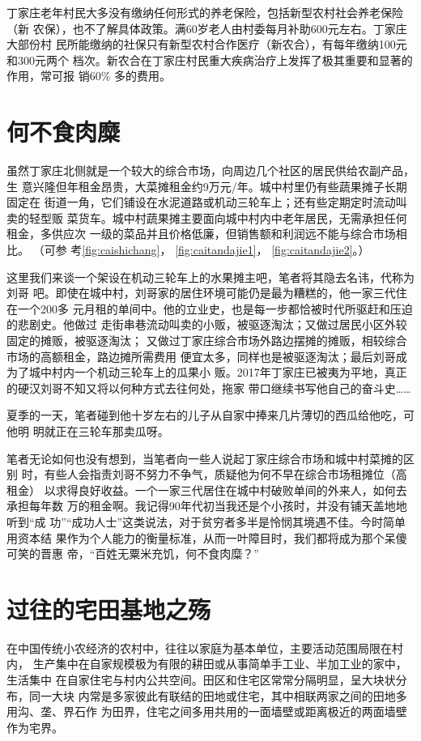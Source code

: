 丁家庄老年村民大多没有缴纳任何形式的养老保险，包括新型农村社会养老保险（新
农保），也不了解具体政策。满60岁老人由村委每月补助600元左右。丁家庄大部份村
民所能缴纳的社保只有新型农村合作医疗（新农合），有每年缴纳100元和300元两个
档次。新农合在丁家庄村民重大疾病治疗上发挥了极其重要和显著的作用，常可报
销60\% 多的费用。

\section{何不食肉糜}

虽然丁家庄北侧就是一个较大的综合市场，向周边几个社区的居民供给农副产品，生
意兴隆但年租金昂贵，大菜摊租金约9万元/年。城中村里仍有些蔬果摊子长期固定在
街道一角，它们铺设在水泥道路或机动三轮车上；还有些定期定时流动叫卖的轻型贩
菜货车。城中村蔬果摊主要面向城中村内中老年居民，无需承担任何租金，多供应次
一级的菜品并且价格低廉，但销售额和利润远不能与综合市场相比。 （可参
考\cref{fig:caishichang}， \cref{fig:caitandajie1}，
\cref{fig:caitandajie2}。）

这里我们来谈一个架设在机动三轮车上的水果摊主吧，笔者将其隐去名讳，代称为刘哥
吧。即使在城中村，刘哥家的居住环境可能仍是最为糟糕的，他一家三代住在一个200多
元月租的单间中。他的立业史，也是每一步都恰被时代所驱赶和压迫的悲剧史。他做过
走街串巷流动叫卖的小贩，被驱逐淘汰；又做过居民小区外较固定的摊贩，被驱逐淘汰；
又做过丁家庄综合市场外路边摆摊的摊贩，相较综合市场的高额租金，路边摊所需费用
便宜太多，同样也是被驱逐淘汰；最后刘哥成为了城中村内一个机动三轮车上的瓜果小
贩。2017年丁家庄已被夷为平地，真正的硬汉刘哥不知又将以何种方式去往何处，拖家
带口继续书写他自己的奋斗史……

夏季的一天，笔者碰到他十岁左右的儿子从自家中捧来几片薄切的西瓜给他吃，可他明
明就正在三轮车那卖瓜呀。

笔者无论如何也没有想到，当笔者向一些人说起丁家庄综合市场和城中村菜摊的区别
时，有些人会指责刘哥不努力不争气，质疑他为何不早在综合市场租摊位（高租金）
以求得良好收益。一个一家三代居住在城中村破败单间的外来人，如何去承担每年数
万的租金啊。我记得90年代初当我还是个小孩时，并没有铺天盖地地听到“成
功”“成功人士”这类说法，对于贫穷者多半是怜悯其境遇不佳。今时简单用资本结
果作为个人能力的衡量标准，从而一叶障目时，我们都将成为那个呆傻可笑的晋惠
帝，“百姓无粟米充饥，何不食肉糜？”


\section{过往的宅田基地之殇}

在中国传统小农经济的农村中，往往以家庭为基本单位，主要活动范围局限在村内，
生产集中在自家规模极为有限的耕田或从事简单手工业、半加工业的家中，生活集中
在自家住宅与村内公共空间。田区和住宅区常常分隔明显，呈大块状分布，同一大块
内常是多家彼此有联结的田地或住宅，其中相联两家之间的田地多用沟、垄、界石作
为田界，住宅之间多用共用的一面墙壁或距离极近的两面墙壁作为宅界。

